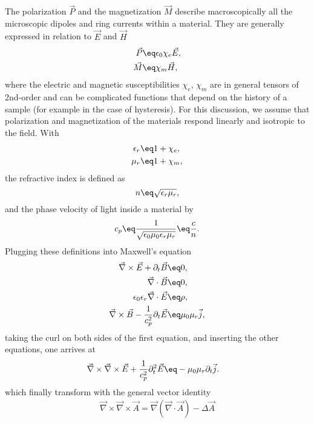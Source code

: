 \documentclass[\main/dresen_thesis.tex]{subfiles}
\begin{document}
    The polarization $\vec{P}$ and the magnetization $\vec{M}$ describe macroscopically all the microscopic dipoles and ring currents within a material.
    They are generally expressed in relation to $\vec{E}$ and $\vec{H}$
    \begin{align}
      \vec{P} \eq& \epsilon_0 \chi_e \vec{E},\\
      \vec{M} \eq& \chi_m \vec{H},
    \end{align}
    where the electric and magnetic susceptibilities $\chi_e$, $\chi_m$ are in general tensors of 2nd-order and can be complicated functions that depend on the history of a sample (for example in the case of hysteresis).
    For this discussion, we assume that polarization and magnetization of the materials respond linearly and isotropic to the field.
    With
    \begin{align}
      \epsilon_r \eq& 1 + \chi_e,\\
      \mu_r \eq& 1 + \chi_m,
    \end{align}
    the refractive index is defined as
    \begin{equation}
      n \eq \sqrt{\epsilon_r \mu_r},
    \end{equation}
    and the phase velocity of light inside a material by
    \begin{equation}
      c_p \eq \frac{1}{\sqrt{\epsilon_0 \mu_0 \epsilon_r \mu_r}} \eq \frac{c}{n}.
    \end{equation}
    Plugging these definitions into Maxwell's equation
    \begin{align}
      \vec{\nabla} \times \vec{E} + \partial_t \vec{B} \eq& 0,\\
      \vec{\nabla} \cdot \vec{B} \eq& 0,\\
      \epsilon_0 \epsilon_r \vec{\nabla} \cdot \vec{E}  \eq& \rho,\\
      \vec{\nabla} \times \vec{B} - \frac{1}{c_p^2} \partial_t \vec{E} \eq& \mu_0 \mu_r \vec{j},
    \end{align}
    taking the curl on both sides of the first equation, and inserting the other equations, one arrives at
    \begin{align}
      \vec{\nabla} \times \vec{\nabla} \times \vec{E} + \frac{1}{c_p^2}\partial_t^2  \vec{E} \eq& - \mu_0 \mu_r \partial_t \vec{j}.
    \end{align}
    which finally transform with the general vector identity
    \begin{align}
      \vec{\nabla} \times \vec{\nabla} \times \vec{A} = \vec{\nabla} (\vec{\nabla} \cdot \vec{A}) - \Delta \vec{A}
    \end{align}
\end{document}
